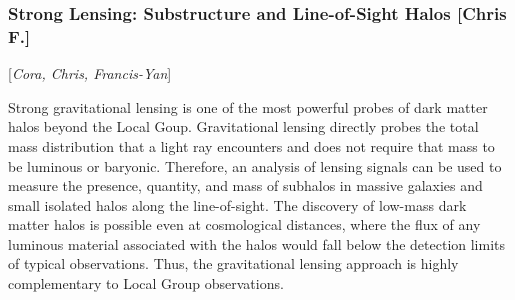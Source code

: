 \documentclass[modern,linenumbers]{aastex62}
\newcommand{\Contributors}[1]{ {\footnotesize [\textit{#1}]}}
\newcommand{\Contact}[1]{ {\footnotesize [\textbf{#1}]}}
\begin{document}










\subsubsection{Strong Lensing: Substructure and Line-of-Sight Halos\Contact{Chris F.} 
\label{sec:stronglens}} 
\Contributors{Cora, Chris, Francis-Yan}

Strong gravitational lensing is one of the most powerful probes of dark matter halos beyond the Local Goup. 
Gravitational lensing directly probes the total mass distribution that a light ray encounters and does not require that mass to be luminous or baryonic.
Therefore, an analysis of lensing signals can be used to measure the presence, quantity, and mass of subhalos in massive galaxies and small isolated halos along the line-of-sight.  
The discovery of low-mass dark matter halos is possible even at cosmological distances, where the flux of any luminous material associated with the halos would fall below the detection limits of typical observations.  
Thus, the gravitational lensing approach is highly complementary to Local Group observations.
\end{document}
